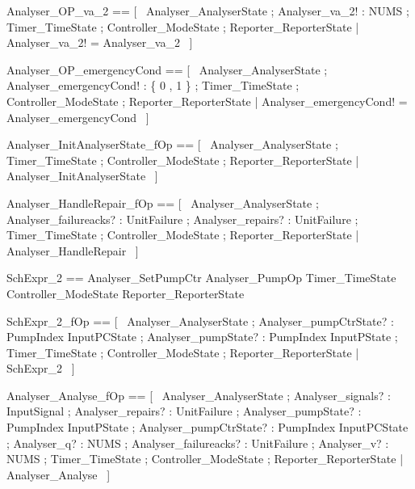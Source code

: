 \documentclass{article}
\begin{document}
\begin{zed}
	Analyser\_OP\_va\_2 == [~  \Xi Analyser\_AnalyserState ; Analyser\_va\_2! : NUMS ; \Xi Timer\_TimeState ; \Xi Controller\_ModeState ; \Xi Reporter\_ReporterState | Analyser\_va\_2! = Analyser\_va\_2  ~]
\end{zed}

\begin{zed}
	Analyser\_OP\_emergencyCond == [~  \Xi Analyser\_AnalyserState ; Analyser\_emergencyCond! : \{ 0 , 1 \} ; \Xi Timer\_TimeState ; \Xi Controller\_ModeState ; \Xi Reporter\_ReporterState | Analyser\_emergencyCond! = Analyser\_emergencyCond  ~]
\end{zed}

\begin{zed}
	Analyser\_InitAnalyserState\_fOp == [~  \Xi Analyser\_AnalyserState ; \Xi Timer\_TimeState ; \Xi Controller\_ModeState ; \Xi Reporter\_ReporterState | \lnot \pre Analyser\_InitAnalyserState  ~]
\end{zed}

\begin{zed}
	Analyser\_HandleRepair\_fOp == [~  \Xi Analyser\_AnalyserState ; Analyser\_failureacks? : \power UnitFailure ; Analyser\_repairs? : \power UnitFailure ; \Xi Timer\_TimeState ; \Xi Controller\_ModeState ; \Xi Reporter\_ReporterState | \lnot \pre Analyser\_HandleRepair  ~]
\end{zed}

\begin{zed}
	SchExpr\_2 == Analyser\_SetPumpCtr \land Analyser\_PumpOp \land \Xi Timer\_TimeState \land \Xi Controller\_ModeState \land \Xi Reporter\_ReporterState
\end{zed}

\begin{zed}
	SchExpr\_2\_fOp == [~  \Xi Analyser\_AnalyserState ; Analyser\_pumpCtrState? : PumpIndex \fun InputPCState ; Analyser\_pumpState? : PumpIndex \fun InputPState ; \Xi Timer\_TimeState ; \Xi Controller\_ModeState ; \Xi Reporter\_ReporterState | \lnot \pre SchExpr\_2  ~]
\end{zed}

\begin{zed}
	Analyser\_Analyse\_fOp == [~  \Xi Analyser\_AnalyserState ; Analyser\_signals? : \power InputSignal ; Analyser\_repairs? : \power UnitFailure ; Analyser\_pumpState? : PumpIndex \fun InputPState ; Analyser\_pumpCtrState? : PumpIndex \fun InputPCState ; Analyser\_q? : NUMS ; Analyser\_failureacks? : \power UnitFailure ; Analyser\_v? : NUMS ; \Xi Timer\_TimeState ; \Xi Controller\_ModeState ; \Xi Reporter\_ReporterState | \lnot \pre Analyser\_Analyse  ~]
\end{zed}
\end{document}

